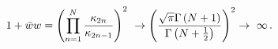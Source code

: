 \begin{equation}
1+\bar{w}w=\left( \prod_{n=1}^{N}{\frac{\kappa _{2n}}{\kappa _{2n-1}}}%
\right) ^{2}~\rightarrow \left( \frac{\sqrt{\pi }\Gamma \left( N+1\right) }{%
\Gamma \left( N+\frac{1}{2}\right) }\right) ^{2}\rightarrow ~\infty \,.
\end{equation}

